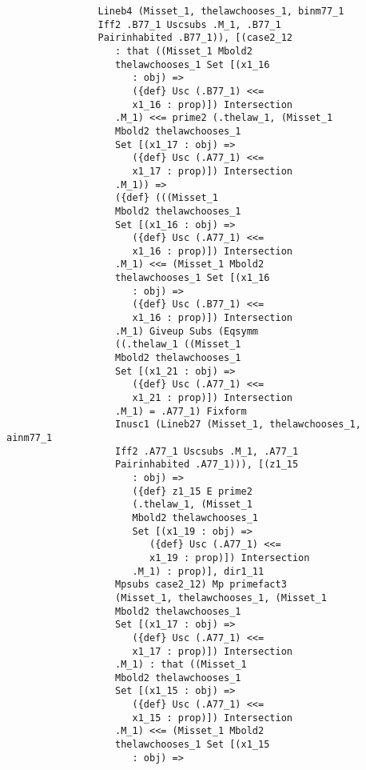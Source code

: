 \documentclass[12pt]{article}
\begin{document}
\begin{verbatim}
                Lineb4 (Misset_1, thelawchooses_1, binm77_1 
                Iff2 .B77_1 Uscsubs .M_1, .B77_1 
                Pairinhabited .B77_1)), [(case2_12 
                   : that ((Misset_1 Mbold2 
                   thelawchooses_1 Set [(x1_16 
                      : obj) => 
                      ({def} Usc (.B77_1) <<= 
                      x1_16 : prop)]) Intersection 
                   .M_1) <<= prime2 (.thelaw_1, (Misset_1 
                   Mbold2 thelawchooses_1 
                   Set [(x1_17 : obj) => 
                      ({def} Usc (.A77_1) <<= 
                      x1_17 : prop)]) Intersection 
                   .M_1)) => 
                   ({def} (((Misset_1 
                   Mbold2 thelawchooses_1 
                   Set [(x1_16 : obj) => 
                      ({def} Usc (.A77_1) <<= 
                      x1_16 : prop)]) Intersection 
                   .M_1) <<= (Misset_1 Mbold2 
                   thelawchooses_1 Set [(x1_16 
                      : obj) => 
                      ({def} Usc (.B77_1) <<= 
                      x1_16 : prop)]) Intersection 
                   .M_1) Giveup Subs (Eqsymm 
                   ((.thelaw_1 ((Misset_1 
                   Mbold2 thelawchooses_1 
                   Set [(x1_21 : obj) => 
                      ({def} Usc (.A77_1) <<= 
                      x1_21 : prop)]) Intersection 
                   .M_1) = .A77_1) Fixform 
                   Inusc1 (Lineb27 (Misset_1, thelawchooses_1, ainm77_1 
                   Iff2 .A77_1 Uscsubs .M_1, .A77_1 
                   Pairinhabited .A77_1))), [(z1_15 
                      : obj) => 
                      ({def} z1_15 E prime2 
                      (.thelaw_1, (Misset_1 
                      Mbold2 thelawchooses_1 
                      Set [(x1_19 : obj) => 
                         ({def} Usc (.A77_1) <<= 
                         x1_19 : prop)]) Intersection 
                      .M_1) : prop)], dir1_11 
                   Mpsubs case2_12) Mp primefact3 
                   (Misset_1, thelawchooses_1, (Misset_1 
                   Mbold2 thelawchooses_1 
                   Set [(x1_17 : obj) => 
                      ({def} Usc (.A77_1) <<= 
                      x1_17 : prop)]) Intersection 
                   .M_1) : that ((Misset_1 
                   Mbold2 thelawchooses_1 
                   Set [(x1_15 : obj) => 
                      ({def} Usc (.A77_1) <<= 
                      x1_15 : prop)]) Intersection 
                   .M_1) <<= (Misset_1 Mbold2 
                   thelawchooses_1 Set [(x1_15 
                      : obj) => 

\end{verbatim}
\end{document}
